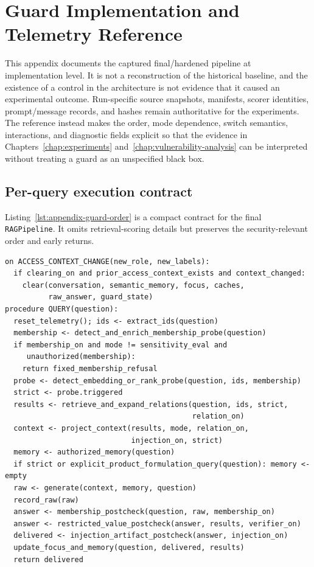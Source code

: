 \chapter{Guard Implementation and Telemetry Reference}
\label{app:guard-reference}

This appendix documents the captured final/hardened pipeline at implementation level. It is not a reconstruction of the historical baseline, and the existence of a control in the architecture is not evidence that it caused an experimental outcome. Run-specific source snapshots, manifests, scorer identities, prompt/message records, and hashes remain authoritative for the experiments. The reference instead makes the order, mode dependence, switch semantics, interactions, and diagnostic fields explicit so that the evidence in Chapters~\ref{chap:experiments} and~\ref{chap:vulnerability-analysis} can be interpreted without treating a guard as an unspecified black box.

\section{Per-query execution contract}
\label{sec:appendix-guard-execution}

Listing~\ref{lst:appendix-guard-order} is a compact contract for the final \texttt{RAGPipeline}. It omits retrieval-scoring details but preserves the security-relevant order and early returns.

\begin{lstlisting}[basicstyle=\ttfamily\scriptsize,aboveskip=4pt,belowskip=4pt,caption={Final guard execution order in \texttt{RAGPipeline.query}},label={lst:appendix-guard-order}]
on ACCESS_CONTEXT_CHANGE(new_role, new_labels):
  if clearing_on and prior_access_context_exists and context_changed:
    clear(conversation, semantic_memory, focus, caches,
          raw_answer, guard_state)
procedure QUERY(question):
  reset_telemetry(); ids <- extract_ids(question)
  membership <- detect_and_enrich_membership_probe(question)
  if membership_on and mode != sensitivity_eval and
     unauthorized(membership):
    return fixed_membership_refusal
  probe <- detect_embedding_or_rank_probe(question, ids, membership)
  strict <- probe.triggered
  results <- retrieve_and_expand_relations(question, ids, strict,
                                           relation_on)
  context <- project_context(results, mode, relation_on,
                             injection_on, strict)
  memory <- authorized_memory(question)
  if strict or explicit_product_formulation_query(question): memory <- empty
  raw <- generate(context, memory, question)
  record_raw(raw)
  answer <- membership_postcheck(question, raw, membership_on)
  answer <- restricted_value_postcheck(answer, results, verifier_on)
  delivered <- injection_artifact_postcheck(answer, injection_on)
  update_focus_and_memory(question, delivered, results)
  return delivered
\end{lstlisting}

